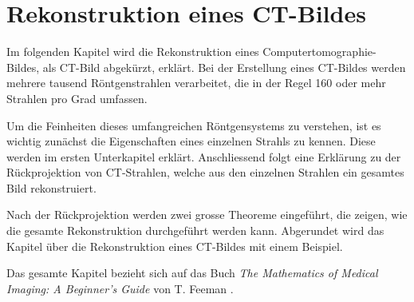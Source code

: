 %
%
%
%
\chapter{Rekonstruktion eines CT-Bildes \label{chapter:ct}}
\begin{refsection}
%

Im folgenden Kapitel wird die Rekonstruktion eines Computertomographie-Bildes, als CT-Bild abgekürzt, erklärt. 
%
Bei der Erstellung eines CT-Bildes werden mehrere tausend Röntgenstrahlen verarbeitet, die in der Regel 160 oder mehr Strahlen pro Grad umfassen. 
%

Um die Feinheiten dieses umfangreichen Röntgensystems zu verstehen, ist es wichtig zunächst die Eigenschaften eines einzelnen Strahls zu kennen. Diese werden im ersten Unterkapitel erklärt. 
Anschliessend folgt eine Erklärung zu der Rückprojektion von CT-Strahlen, welche aus den einzelnen Strahlen ein gesamtes Bild rekonstruiert. 

Nach der Rückprojektion werden zwei grosse Theoreme eingeführt, die zeigen, wie die gesamte Rekonstruktion durchgeführt werden kann. Abgerundet wird das Kapitel über die Rekonstruktion eines CT-Bildes mit einem Beispiel.

Das gesamte Kapitel bezieht sich auf das Buch \emph{The Mathematics of Medical Imaging: A Beginner's Guide} von T. Feeman \cite{feeman_mathematics_2015}.






\printbibliography[heading=subbibliography]
\end{refsection}
